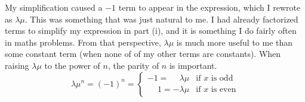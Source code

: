\documentclass[a4paper]{article}
\begin{document}
My simplification caused a $-1$ term to appear in the expression, which I rewrote as $\lambda\mu$.
This was something that was just natural to me.
I had already factorized terms to simplify my expression in part (i), and it is something I do fairly often in maths problems.
From that perspective, $\lambda\mu$ is much more useful to me than some constant term (when none of of my other terms are constants).
When raising $\lambda\mu$ to the power of $n$, the parity of $n$ is important.
\begin{equation}
    \lambda\mu^n = (-1)^n =
    \begin{cases}
        -1 = \phantom{-} \lambda\mu  & \text{if } x \text{ is odd}  \\
        \phantom{-}1  =  -\lambda\mu & \text{if } x \text{ is even}
    \end{cases}
\end{equation}
\end{document}
